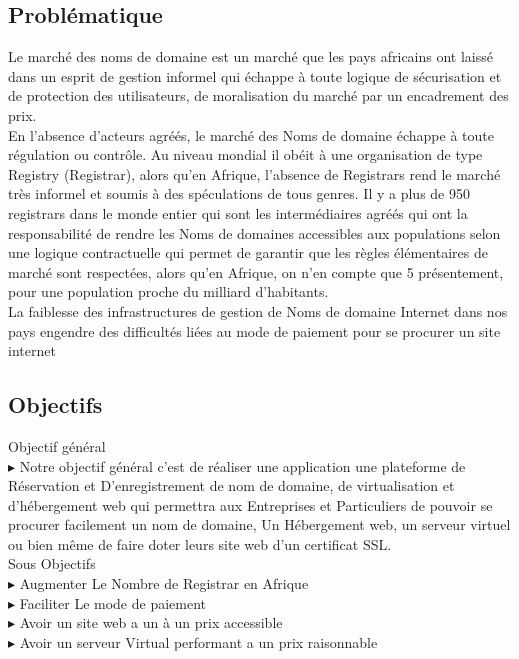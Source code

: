 \documentclass[a4paper, 12pt]{report}
\begin{document}
\subsection{Problématique}
\noindent Le marché des noms de domaine est un marché que les pays africains ont laissé dans un esprit de gestion informel qui échappe à toute logique de sécurisation et de protection des utilisateurs, de moralisation du marché par un encadrement des prix.\\
\noindent En l’absence d’acteurs agréés, le marché des Noms de domaine échappe à toute régulation ou contrôle. Au niveau mondial il obéit à une organisation de type Registry (Registrar), alors qu’en Afrique, l’absence de Registrars rend le marché très informel et soumis à des spéculations de tous genres. Il y a plus de 950 registrars dans le monde entier qui sont les intermédiaires agréés qui ont la responsabilité de rendre les Noms de domaines accessibles aux populations selon une logique contractuelle qui permet de garantir que les règles élémentaires de marché sont respectées, alors qu’en Afrique, on n’en compte que 5 présentement, pour une population proche du milliard d’habitants.  \\                                                            
\noindent La faiblesse des infrastructures de gestion de Noms de domaine Internet dans nos pays engendre des difficultés liées au mode de paiement pour se procurer un site internet 

\subsection{Objectifs}
\noindent Objectif général 
\\
\noindent $\blacktriangleright$ Notre objectif général c’est de réaliser une application une plateforme de Réservation et D’enregistrement de nom de domaine, de virtualisation et d’hébergement web qui permettra aux Entreprises et Particuliers de pouvoir se procurer facilement un nom de domaine, Un Hébergement web, un serveur virtuel ou bien même de faire doter leurs site web d’un certificat SSL.
\\
\noindent Sous Objectifs
\\ $\blacktriangleright$ Augmenter Le Nombre de Registrar en Afrique 
\noindent
\\ $\blacktriangleright$ Faciliter Le mode de paiement
\noindent
\\ $\blacktriangleright$ Avoir un site web a un à un prix accessible
\noindent
\\ $\blacktriangleright$ Avoir un serveur Virtual performant a un prix raisonnable 
\end{document}
